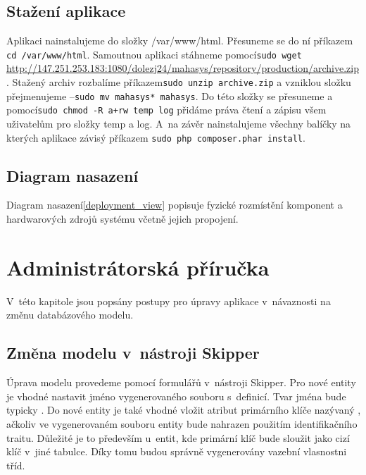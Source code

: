 \documentclass[thesis=B,czech]{FITthesis}[2012/06/26]
\begin{document}
\subsection{Stažení aplikace}
	Aplikaci nainstalujeme do složky /var/www/html. Přesuneme se do ní příkazem \verb|cd /var/www/html|. Samoutnou aplikaci stáhneme pomocí\newline\verb|sudo wget | \url{http://147.251.253.183:1080/dolezj24/mahasys/repository/production/archive.zip}. Stažený archiv rozbalíme příkazem\newline\verb|sudo unzip archive.zip| a vzniklou složku přejmenujeme --\newline\verb|sudo mv mahasys* mahasys|. Do této složky se přesuneme a pomocí\newline\verb|sudo chmod -R a+rw temp log| přidáme práva čtení a zápisu všem uživatelům pro složky temp a log. A~na závěr nainstalujeme všechny balíčky na kterých aplikace závisý příkazem \verb|sudo php composer.phar install|.
\subsection{Diagram nasazení}
	Diagram nasazení\ref{deployment_view} popisuje fyzické rozmístění komponent a hardwarových zdrojů systému včetně jejich propojení.\cite{si1_pred7}
	
\section{Administrátorská příručka}
	V~této kapitole jsou popsány postupy pro úpravy aplikace v~návaznosti na změnu databázového modelu.
\subsection{Změna modelu v~nástroji Skipper}
	Úprava modelu provedeme pomocí formulářů v~nástroji Skipper. Pro nové entity je vhodné nastavit jméno vygenerovaného souboru s~definicí. Tvar jména bude typicky . Do nové entity je také vhodné vložit atribut primárního klíče nazývaný , ačkoliv ve vygenerovaném souboru entity bude nahrazen použitím identifikačního traitu. Důležité je to především u~entit, kde primární klíč bude sloužit jako cizí klíč v~jiné tabulce. Díky tomu budou správně vygenerovány vazební vlasnostni tříd.
\end{document}
